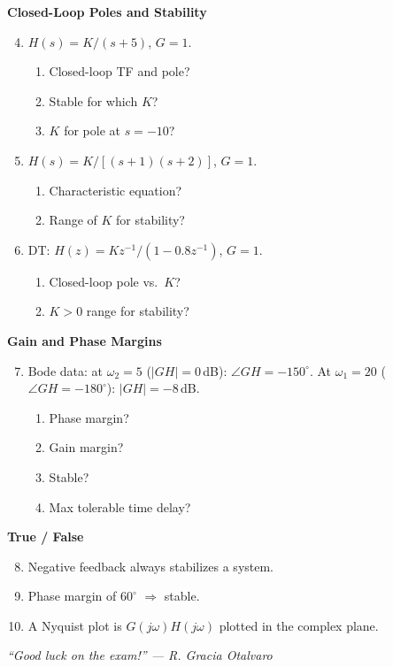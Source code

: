 \documentclass[11pt]{article}
\begin{document}
\textbf{Closed-Loop Poles and Stability}
\begin{enumerate}\setcounter{enumi}{3}
  \item $H(s) = K/(s+5)$, $G = 1$.
    \begin{enumerate}
      \item Closed-loop TF and pole?
      \item Stable for which $K$?
      \item $K$ for pole at $s = -10$?
    \end{enumerate}
  \item $H(s) = K/[(s+1)(s+2)]$, $G = 1$.
    \begin{enumerate}
      \item Characteristic equation?
      \item Range of $K$ for stability?
    \end{enumerate}
  \item DT: $H(z) = Kz^{-1}/(1 - 0.8 z^{-1})$, $G = 1$.
    \begin{enumerate}
      \item Closed-loop pole vs.\ $K$?
      \item $K > 0$ range for stability?
    \end{enumerate}
\end{enumerate}

\textbf{Gain and Phase Margins}
\begin{enumerate}\setcounter{enumi}{6}
  \item Bode data: at $\omega_2 = 5$ ($|GH| = 0$\,dB): $\angle GH = -150^\circ$. At $\omega_1 = 20$ ($\angle GH = -180^\circ$): $|GH| = -8$\,dB.
    \begin{enumerate}
      \item Phase margin?
      \item Gain margin?
      \item Stable?
      \item Max tolerable time delay?
    \end{enumerate}
\end{enumerate}

\textbf{True / False}
\begin{enumerate}\setcounter{enumi}{7}
  \item Negative feedback always stabilizes a system.
  \item Phase margin of $60^\circ$ $\Rightarrow$ stable.
  \item A Nyquist plot is $G(j\omega)H(j\omega)$ plotted in the complex plane.
\end{enumerate}

\vspace{1em}
\begin{center}
\emph{``Good luck on the exam!'' --- R. Gracia Otalvaro}
\end{center}
\end{document}
